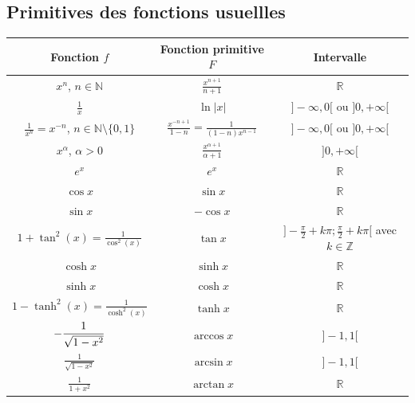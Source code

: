 \documentclass[french]{book}
\begin{document}
\subsection{Primitives des fonctions usuellles}

\renewcommand\arraystretch{2}
\begin{center}
\begin{tabular}{|c|c|c|}
\hline
 Fonction $f$     &Fonction primitive $F$& Intervalle   \\
 \hline
 \rule[-2.5ex]{0pt}{6ex}
$x^n$, $n\in{\mathbb N}$  &$\displaystyle\frac{x^{n+1}}{n+1}$&${\mathbb R}$  \\
 \hline
\rule[-2.5ex]{0pt}{6ex}
$\displaystyle\frac{1}{x}$ &$\ln\vert x\vert$&$]-\infty,0[$ ou $]0,+\infty[$  \\
 \hline
\rule[-2.5ex]{0pt}{6ex}
$\displaystyle\frac{1}{x^n}=x^{-n}$, $n\in{\mathbb N}\setminus\{0,1\}$  &$\displaystyle\frac{x^{-n+1}}{1-n}=\frac{1}{(1-n)x^{n-1}}$&$]-\infty,0[$ ou $]0,+\infty[$  \\
\hline
\rule[-2.5ex]{0pt}{6ex}
$x^{\alpha}$, $\alpha>0$  &$\displaystyle\frac{x^{\alpha+1}}{\alpha+1}$&$]0,+\infty[$  \\
 \hline\hline
 $e^x$   &$e^x$&${\mathbb R}$  \\
 \hline\hline
 $\cos x$    &$\sin x$&${\mathbb R}$  \\
 \hline
 $\sin x$     &$-\cos x$&${\mathbb R}$  \\
  \hline
\rule[-2.5ex]{0pt}{6ex}  $1+\tan^2( x)= \displaystyle\frac{1}{\cos^2(x)}$&$\tan x$ &$]-\frac{\pi}{2}+k\pi;\frac{\pi}{2}+k\pi[$ avec $k\in{\mathbb Z}$  \\
 \hline
  \hline
 $\cosh x$    &$\sinh x$&${\mathbb R}$  \\
 \hline
 $\sinh x$   &$\cosh x$&${\mathbb R}$  \\
 \hline
 \rule[-2.5ex]{0pt}{6ex}  $1-\tanh^2(x)= \displaystyle\frac{1}{\cosh^2(x)}$&$\tanh x$&${\mathbb R}$  \\
 \hline\hline
\rule[-2.5ex]{0pt}{6ex}     $-\displaystyle \displaystyle\frac{1}{\sqrt{1-x^2}}$&$\arccos x$ &$]-1,1[$  \\
 \hline
\rule[-2.5ex]{0pt}{6ex}   $\displaystyle\frac{1}{\sqrt{1-x^2}}$& $\arcsin x$ &$]-1,1[$  \\
 \hline
\rule[-2.5ex]{0pt}{6ex}     $\displaystyle\frac{1}{1+x^2}$& $\arctan x$&${\mathbb R}$  \\
 \hline
\end{tabular}
\end{center}
\end{document}
